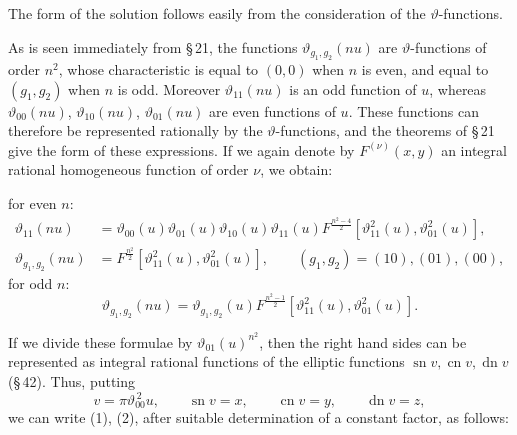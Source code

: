 \documentclass[11pt]{article}
\providecommand{\sn}{\operatorname{sn}}
\providecommand{\cn}{\operatorname{cn}}
\providecommand{\dn}{\operatorname{dn}}
\begin{document}
The form of the solution follows easily from the consideration of the $\vartheta$-functions.

As is seen immediately from \S\,21, the functions $\vartheta_{g_1,g_2}(n u)$ are
$\vartheta$-functions of order $n^2$, whose characteristic is equal to $(0,0)$ when $n$ is
even, and equal to $(g_1,g_2)$ when $n$ is odd. Moreover $\vartheta_{11}(nu)$ is an odd
function of $u$, whereas $\vartheta_{00}(nu)$, $\vartheta_{10}(nu)$, $\vartheta_{01}(nu)$ are
even functions of $u$. These functions can therefore be represented rationally by the
$\vartheta$-functions, and the theorems of \S\,21 give the form of these expressions. If we
again denote by $F^{(\nu)}(x,y)$ an integral rational homogeneous function of order $\nu$,
we obtain:

for even $n$:
\begin{equation}
\begin{aligned}
\vartheta_{11}(nu)
&=\vartheta_{00}(u)\vartheta_{01}(u)\vartheta_{10}(u)\vartheta_{11}(u)
 F^{\frac{n^2-4}{2}}\!\left[\vartheta_{11}^2(u),\vartheta_{01}^2(u)\right],\\
\vartheta_{g_1,g_2}(nu)
&=F^{\frac{n^2}{2}}\!\left[\vartheta_{11}^2(u),\vartheta_{01}^2(u)\right],
\qquad (g_1,g_2)=(10),(01),(00),
\end{aligned}
\tag{1}
\end{equation}
for odd $n$:
\begin{equation}
\vartheta_{g_1,g_2}(nu)
=\vartheta_{g_1,g_2}(u)F^{\frac{n^2-1}{2}}\!\left[\vartheta_{11}^2(u),\vartheta_{01}^2(u)\right].
\tag{2}
\end{equation}

If we divide these formulae by $\vartheta_{01}(u)^{n^2}$, then the right hand sides can
be represented as integral rational functions of the elliptic functions
$\sn v,\cn v,\dn v$ (\S\,42). Thus, putting
\begin{equation}
v=\pi\vartheta_{00}^{\,2}u,\qquad \sn v=x,\qquad \cn v=y,\qquad \dn v=z,
\tag{3}
\end{equation}
we can write (1), (2), after suitable determination of a constant factor, as follows:
\end{document}
